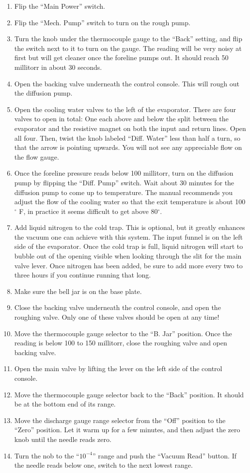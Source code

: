\documentclass{thesis-umich}
\begin{document}
\begin{enumerate}
	\item Flip the ``Main Power'' switch.
	\item Flip the ``Mech. Pump'' switch to turn on the rough pump.
	\item Turn the knob under the thermocouple gauge to the ``Back'' setting, and flip the switch next to it to turn on the gauge. The reading will be very noisy at first but will get cleaner once the foreline pumps out. It should reach 50 millitorr in about 30 seconds.
	\item Open the backing valve underneath the control console. This will rough out the diffusion pump.
	\item Open the cooling water valves to the left of the evaporator. There are four valves to open in total: One each above and below the split between the evaporator and the resistive magnet on both the input and return lines. Open all four. Then, twist the knob labeled ``Diff. Water'' less than half a turn, so that the arrow is pointing upwards. You will not see any appreciable flow on the flow gauge.
	\item Once the foreline pressure reads below 100 millitorr, turn on the diffusion pump by flipping the ``Diff. Pump'' switch. Wait about 30 minutes for the diffusion pump to come up to temperature. The manual recommends you adjust the flow of the cooling water so that the exit temperature is about 100$^\circ$ F, in practice it seems difficult to get above 80$^\circ$.
	\item Add liquid nitrogen to the cold trap. This is optional, but it greatly enhances the vacuum one can achieve with this system. The input funnel is on the left side of the evaporator. Once the cold trap is full, liquid nitrogen will start to bubble out of the opening visible when looking through the slit for the main valve lever. Once nitrogen has been added, be sure to add more every two to three hours if you continue running that long.
	\item Make sure the bell jar is on the base plate.
	\item Close the backing valve underneath the control console, and open the roughing valve. Only one of these valves should be open at any time!
	\item Move the thermocouple gauge selector to the ``B. Jar'' position. Once the reading is below 100 to 150 millitorr, close the roughing valve and open backing valve.
	\item Open the main valve by lifting the lever on the left side of the control console.
	\item Move the thermocouple gauge selector back to the ``Back'' position. It should be at the bottom end of its range.
	\item Move the discharge gauge range selector from the ``Off'' position to the ``Zero'' position. Let it warm up for a few minutes, and then adjust the zero knob until the needle reads zero.
	\item Turn the nob to the ``$10^{-4}$'' range and push the ``Vacuum Read'' button. If the needle reads below one, switch to the next lowest range.
\end{enumerate}
\end{document}
